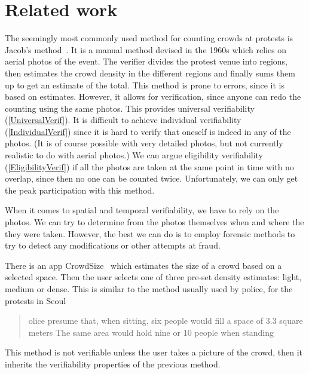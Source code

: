 \section{Related work}%
\label{RelatedWork}

The seemingly most commonly used method for counting crowds at protests is 
Jacob's method~\cite[c.f.][]{%
  2016DemonstrationsInSeoul,%
  BBCHowToCountProtestNumbers,%
  HowWillWeKnowTrumpInauguralCrowdSize,%
  TheXManMarch,%
  TheCrowdNumbersGame,%
}.
It is a manual method devised in the 1960s which relies on aerial photos of the 
event.
The verifier divides the protest venue into regions, then estimates the crowd 
density in the different regions and finally sums them up to get an estimate of 
the total.
This method is prone to errors, since it is based on estimates.
However, it allows for verification, since anyone can redo the counting using 
the same photos.
This provides universal verifiability (\cref{UniversalVerif}).
It is difficult to achieve individual verifiability (\cref{IndividualVerif}) 
since it is hard to verify that oneself is indeed in any of the photos.
(It is of course possible with very detailed photos, but not currently realistic 
to do with aerial photos.)
We can argue eligibility verifiability (\cref{EligibilityVerif}) if all the 
photos are taken at the same point in time with no overlap, since then no one 
can be counted twice.
Unfortunately, we can only get the peak participation with this method.

When it comes to spatial and temporal verifiability, we have to rely on the 
photos.
We can try to determine from the photos themselves when and where the they were 
taken.
However, the best we can do is to employ forensic methods to try to detect any 
modifications or other attempts at fraud.

There is an app CrowdSize~\cite{CrowdSize} which estimates the size of a crowd 
based on a selected space.
Then the user selects one of three pre-set density estimates: light, medium or 
dense.
This is similar to the method usually used by police, \eg for the protests in
Seoul
\blockcquote{2016DemonstrationsInSeoul}{%
  olice presume that, when sitting, six people would 
  fill a space of 
  3.3 square meters
  \textelp{}
  The same area would hold nine or 10 people when standing%
}.
This method is not verifiable unless the user takes a picture of the crowd, 
then it inherits the verifiability properties of the previous method.

